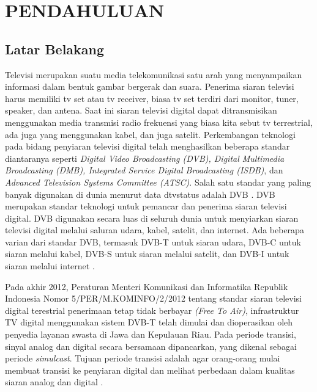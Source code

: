 \chapter{PENDAHULUAN}
\titlespacing*{\chapter}{0pt}{0pt}{0pt}
\section{Latar Belakang}
\label{sec:1-LatarBelakang}

\hspace{1,2cm}Televisi merupakan suatu media telekomunikasi satu arah yang menyampaikan informasi dalam bentuk gambar bergerak dan suara. Penerima siaran televisi harus memiliki tv set atau tv receiver, biasa tv set terdiri dari monitor, tuner, speaker, dan antena. Saat ini siaran televisi digital dapat ditransmisikan menggunakan media transmisi radio frekuensi yang biasa kita sebut tv terrestrial, ada juga yang menggunakan kabel, dan juga satelit. Perkembangan teknologi pada bidang penyiaran televisi digital telah menghasilkan beberapa standar diantaranya seperti \textit{Digital Video Broadcasting (DVB), Digital Multimedia Broadcasting (DMB), Integrated Service Digital Broadcasting (ISDB)}, dan \textit{Advanced Television Systems Committee (ATSC)}.  Salah satu standar yang paling banyak digunakan di dunia menurut data dtvstatus adalah DVB \citep{dtvstatus2017}. DVB merupakan standar teknologi untuk pemancar dan penerima siaran televisi digital. DVB digunakan secara luas di seluruh dunia untuk menyiarkan siaran televisi digital melalui saluran udara, kabel, satelit, dan internet. Ada beberapa varian dari standar DVB, termasuk DVB-T untuk siaran udara, DVB-C untuk siaran melalui kabel, DVB-S untuk siaran melalui satelit, dan DVB-I untuk siaran melalui internet \citep{Reimers2006}\citep{Chochliouros2009}.

Pada akhir 2012, Peraturan Menteri Komunikasi dan Informatika Republik Indonesia Nomor 5/PER/M.KOMINFO/2/2012 tentang standar siaran televisi digital terestrial penerimaan tetap tidak berbayar \textit{(Free To Air)}, infrastruktur TV digital menggunakan sistem DVB-T telah dimulai dan dioperasikan oleh penyedia layanan swasta di Jawa dan Kepulauan Riau. Pada periode transisi, sinyal analog dan digital secara bersamaan dipancarkan, yang dikenal sebagai periode \textit{simulcast}. Tujuan periode transisi adalah agar orang-orang mulai membuat transisi ke penyiaran digital dan melihat perbedaan dalam kualitas siaran analog dan digital \citep{Suryanto2021}.

